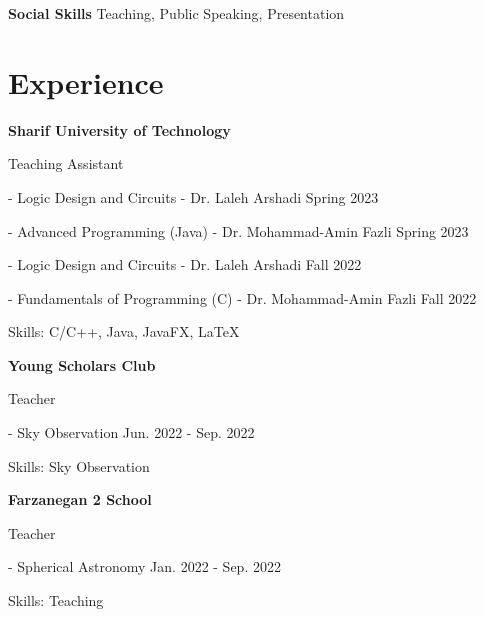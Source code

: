 \documentclass{article}
\begin{document}
\faCommentO \hspace{1mm} \textbf{Social Skills} \hfill Teaching, Public Speaking, Presentation


\section*{\textcolor{BrickRed}{Exp}erience  \noindent\hrulefill}
\textbf{Sharif University of Technology}

\hspace{5mm}
Teaching Assistant 


\hspace{5mm}
 - Logic Design and Circuits - Dr. Laleh Arshadi \hfill Spring 2023

\hspace{5mm}
- Advanced Programming (Java) - Dr. Mohammad-Amin Fazli \hfill Spring 2023

\hspace{5mm}
 - Logic Design and Circuits - Dr. Laleh Arshadi \hfill Fall 2022

\hspace{5mm}
- Fundamentals of Programming (C) - Dr. Mohammad-Amin Fazli \hfill Fall 2022

\hspace{5mm}
Skills: C/C++, Java, JavaFX, LaTeX

\vspace{5mm}

\textbf{Young Scholars Club}

\hspace{5mm}
Teacher

\hspace{5mm}
 - Sky Observation \hfill Jun. 2022 - Sep. 2022

\hspace{5mm}
Skills: Sky Observation

\vspace{5mm}

\textbf{Farzanegan 2 School}

\hspace{5mm}
Teacher

\hspace{5mm}
 - Spherical Astronomy \hfill Jan. 2022 - Sep. 2022

\hspace{5mm}
Skills: Teaching

\vspace{5mm}

\newpage
\end{document}
